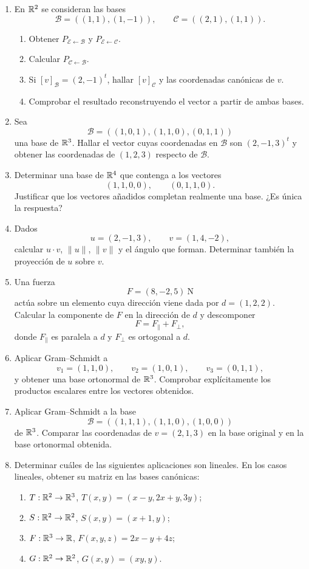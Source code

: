 \begin{enumerate}[label=\textbf{\arabic*.},leftmargin=*]
\item En $\mathbb{R}^2$ se consideran las bases
\[
\mathcal B=((1,1),(1,-1)),
\qquad
\mathcal C=((2,1),(1,1)).
\]
\begin{enumerate}[label=\alph*)]
\item Obtener $P_{\mathcal E\leftarrow\mathcal B}$ y $P_{\mathcal E\leftarrow\mathcal C}$.
\item Calcular $P_{\mathcal C\leftarrow\mathcal B}$.
\item Si $[v]_{\mathcal B}=(2,-1)^t$, hallar $[v]_{\mathcal C}$ y las coordenadas canónicas de $v$.
\item Comprobar el resultado reconstruyendo el vector a partir de ambas bases.
\end{enumerate}

\item Sea
\[
\mathcal B=((1,0,1),(1,1,0),(0,1,1))
\]
una base de $\mathbb{R}^3$. Hallar el vector cuyas coordenadas en $\mathcal B$ son $(2,-1,3)^t$ y obtener las coordenadas de $(1,2,3)$ respecto de $\mathcal B$.

\item Determinar una base de $\mathbb{R}^4$ que contenga a los vectores
\[
(1,1,0,0),\qquad(0,1,1,0).
\]
Justificar que los vectores añadidos completan realmente una base. ¿Es única la respuesta?

\item Dados
\[
u=(2,-1,3),
\qquad
v=(1,4,-2),
\]
calcular $u\cdot v$, $\|u\|$, $\|v\|$ y el ángulo que forman. Determinar también la proyección de $u$ sobre $v$.

\item Una fuerza
\[
F=(8,-2,5)\ \mathrm{N}
\]
actúa sobre un elemento cuya dirección viene dada por $d=(1,2,2)$. Calcular la componente de $F$ en la dirección de $d$ y descomponer
\[
F=F_{\parallel}+F_{\perp},
\]
donde $F_{\parallel}$ es paralela a $d$ y $F_{\perp}$ es ortogonal a $d$.

\item Aplicar Gram--Schmidt a
\[
v_1=(1,1,0),
\qquad
v_2=(1,0,1),
\qquad
v_3=(0,1,1),
\]
y obtener una base ortonormal de $\mathbb{R}^3$. Comprobar explícitamente los productos escalares entre los vectores obtenidos.

\item Aplicar Gram--Schmidt a la base
\[
\mathcal B=((1,1,1),(1,1,0),(1,0,0))
\]
de $\mathbb{R}^3$. Comparar las coordenadas de $v=(2,1,3)$ en la base original y en la base ortonormal obtenida.

\item Determinar cuáles de las siguientes aplicaciones son lineales. En los casos lineales, obtener su matriz en las bases canónicas:
\begin{enumerate}[label=\alph*)]
\item $T:\mathbb{R}^2\to\mathbb{R}^3$, $T(x,y)=(x-y,2x+y,3y)$;
\item $S:\mathbb{R}^2\to\mathbb{R}^2$, $S(x,y)=(x+1,y)$;
\item $F:\mathbb{R}^3\to\mathbb{R}$, $F(x,y,z)=2x-y+4z$;
\item $G:\mathbb{R}^2\to\mathbb{R}^2$, $G(x,y)=(xy,y)$.
\end{enumerate}


\end{enumerate}
